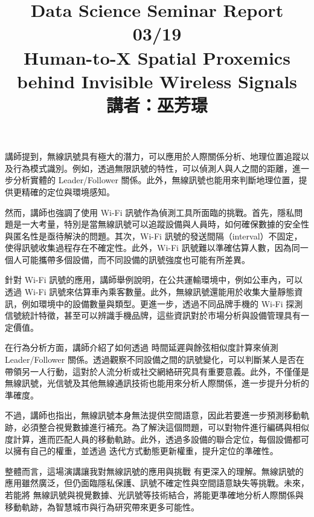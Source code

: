 \documentclass{homework}
\begin{document}
\title{Data Science Seminar Report 03/19 \\ Human-to-X Spatial Proxemics behind Invisible Wireless Signals \\ 講者：巫芳璟}
\author{\chineseName \masterStudentID}
\date{}
\maketitle

講師提到，無線訊號具有極大的潛力，可以應用於人際關係分析、地理位置追蹤以及行為模式識別。例如，透過無限訊號的特性，可以偵測人與人之間的距離，進一步分析實體的 Leader/Follower 關係。此外，無線訊號也能用來判斷地理位置，提供更精確的定位與環境感知。

然而，講師也強調了使用 Wi-Fi 訊號作為偵測工具所面臨的挑戰。首先，隱私問題是一大考量，特別是當無線訊號可以追蹤設備與人員時，如何確保數據的安全性與匿名性是亟待解決的問題。其次，Wi-Fi 訊號的發送間隔（interval）不固定，使得訊號收集過程存在不確定性。此外，Wi-Fi 訊號難以準確估算人數，因為同一個人可能攜帶多個設備，而不同設備的訊號強度也可能有所差異。

針對 Wi-Fi 訊號的應用，講師舉例說明，在公共運輸環境中，例如公車內，可以透過 Wi-Fi 訊號來估算車內乘客數量。此外，無線訊號還能用於收集大量靜態資訊，例如環境中的設備數量與類型。更進一步，透過不同品牌手機的 Wi-Fi 探測信號統計特徵，甚至可以辨識手機品牌，這些資訊對於市場分析與設備管理具有一定價值。

在行為分析方面，講師介紹了如何透過 時間延遲與餘弦相似度計算來偵測 Leader/Follower 關係。透過觀察不同設備之間的訊號變化，可以判斷某人是否在帶領另一人行動，這對於人流分析或社交網絡研究具有重要意義。此外，不僅僅是無線訊號，光信號及其他無線通訊技術也能用來分析人際關係，進一步提升分析的準確度。

不過，講師也指出，無線訊號本身無法提供空間語意，因此若要進一步預測移動軌跡，必須整合視覺數據進行補充。為了解決這個問題，可以對物件進行編碼與相似度計算，進而匹配人員的移動軌跡。此外，透過多設備的聯合定位，每個設備都可以擁有自己的權重，並透過 迭代方式動態更新權重，提升定位的準確性。

整體而言，這場演講讓我對無線訊號的應用與挑戰 有更深入的理解。無線訊號的應用雖然廣泛，但仍面臨隱私保護、訊號不確定性與空間語意缺失等挑戰。未來，若能將 無線訊號與視覺數據、光訊號等技術結合，將能更準確地分析人際關係與移動軌跡，為智慧城市與行為研究帶來更多可能性。
\end{document}
